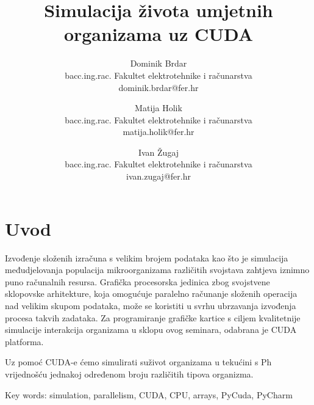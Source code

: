 \documentclass[12pt]{article}
\author{
	Dominik Brdar \\
	bacc.ing.rac. Fakultet elektrotehnike i računarstva \\
	dominik.brdar@fer.hr
	\and
	Matija Holik \\
	bacc.ing.rac. Fakultet elektrotehnike i računarstva \\
	matija.holik@fer.hr
	\and
	Ivan Žugaj \\
	bacc.ing.rac. Fakultet elektrotehnike i računarstva \\
	ivan.zugaj@fer.hr
}
\begin{document}
	\begin{titlepage}
	\title{
		Simulacija života umjetnih organizama uz CUDA
	}
	\maketitle
	\end{titlepage}

	\section{Uvod}
	Izvođenje složenih izračuna s velikim brojem podataka kao što je simulacija međudjelovanja 
	populacija mikroorganizama različitih svojstava zahtjeva iznimno puno računalnih resursa.
	Grafička procesorska jedinica zbog svojstvene sklopovske arhitekture, koja omogućuje paralelno računanje 
	složenih operacija nad velikim skupom podataka, može se koristiti u svrhu ubrzavanja izvođenja procesa 
	takvih zadataka. Za programiranje grafičke kartice s ciljem kvalitetnije simulacije interakcija organizama 
	u sklopu ovog seminara, odabrana je CUDA platforma.
	
	Uz pomoć CUDA-e ćemo simulirati suživot organizama u tekućini s Ph vrijednošću jednakoj određenom broju različitih tipova organizma.
	
	Key words: simulation, parallelism, CUDA, CPU, arrays, PyCuda, PyCharm
	
\end{document}
